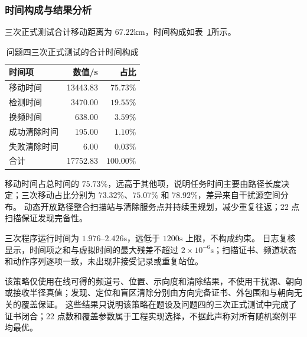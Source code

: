\subsubsection{时间构成与结果分析}

三次正式测试合计移动距离为 $67.22\mathrm{km}$，时间构成如表~\ref{tab:q4_time}所示。

\begin{table}[htbp]
\centering
\caption{问题四三次正式测试的合计时间构成}
\label{tab:q4_time}
\begin{tabular}{lrr}
\toprule
时间项 & 数值/s & 占比 \\
\midrule
移动时间 & 13443.83 & $75.73\%$ \\
检测时间 & 3470.00 & $19.55\%$ \\
换频时间 & 638.00 & $3.59\%$ \\
成功清除时间 & 195.00 & $1.10\%$ \\
失败清除时间 & 6.00 & $0.03\%$ \\
\midrule
合计 & 17752.83 & $100.00\%$ \\
\bottomrule
\end{tabular}
\end{table}

移动时间占总时间的 $75.73\%$，远高于其他项，说明任务时间主要由路径长度决定；三次移动占比分别为 $73.32\%$、$75.07\%$ 和 $78.92\%$，差异来自干扰源空间分布。
动态开放路径整合扫描站与清除服务点并持续重规划，减少重复往返；22 点扫描保证发现完备性。

三次程序运行时间为 $1.976$--$2.426\mathrm{s}$，远低于 $1200\mathrm{s}$ 上限，不构成约束。
日志复核显示，时间项之和与虚拟时间的最大残差不超过 $2\times10^{-6}\mathrm{s}$；扫描证书、频道状态和动作序列逐项一致，未出现非接受记录或重复站位。

该策略仅使用在线可得的频道号、位置、示向度和清除结果，不使用干扰源、朝向或接收半径真值；发现、定位和盲区清除分别由方向完备证书、外包围和与朝向无关的覆盖保证。
这些结果只说明该策略在题设及问题四的三次正式测试中完成了证书闭合；22 点数和覆盖参数属于工程实现选择，不据此声称对所有随机案例平均最优。
